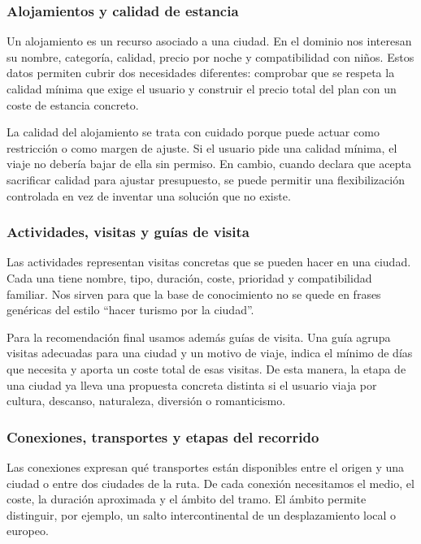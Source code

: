 \documentclass[11pt,a4paper]{article}
\begin{document}
\subsubsection{Alojamientos y calidad de estancia}
Un alojamiento es un recurso asociado a una ciudad. En el dominio nos
interesan su nombre, categor\'ia, calidad, precio por noche y compatibilidad con
ni\~nos. Estos datos permiten cubrir dos necesidades diferentes: comprobar que
se respeta la calidad m\'inima que exige el usuario y construir el precio total
del plan con un coste de estancia concreto.

La calidad del alojamiento se trata con cuidado porque puede actuar como
restricci\'on o como margen de ajuste. Si el usuario pide una calidad m\'inima,
el viaje no deber\'ia bajar de ella sin permiso. En cambio, cuando declara que
acepta sacrificar calidad para ajustar presupuesto, se puede permitir una
flexibilizaci\'on controlada en vez de inventar una soluci\'on que no existe.

\subsubsection{Actividades, visitas y gu\'ias de visita}
Las actividades representan visitas concretas que se pueden hacer en
una ciudad. Cada una tiene nombre, tipo, duraci\'on, coste, prioridad y
compatibilidad familiar. Nos sirven para que la base de conocimiento no se
quede en frases gen\'ericas del estilo ``hacer turismo por la ciudad''.

Para la recomendaci\'on final usamos adem\'as gu\'ias de visita. Una
gu\'ia agrupa visitas adecuadas para una ciudad y un motivo de viaje, indica el
m\'inimo de d\'ias que necesita y aporta un coste total de esas visitas. De esta
manera, la etapa de una ciudad ya lleva una propuesta concreta distinta si el
usuario viaja por cultura, descanso, naturaleza, diversi\'on o romanticismo.

\subsubsection{Conexiones, transportes y etapas del recorrido}
Las conexiones expresan qu\'e transportes est\'an disponibles entre el
origen y una ciudad o entre dos ciudades de la ruta. De cada conexi\'on
necesitamos el medio, el coste, la duraci\'on aproximada y el \'ambito del tramo.
El \'ambito permite distinguir, por ejemplo, un salto intercontinental de un
desplazamiento local o europeo.
\end{document}
